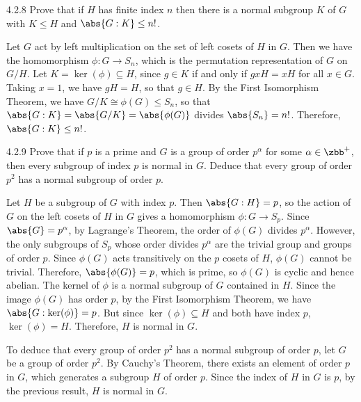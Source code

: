\begin{exercise}{4.2.8}
	Prove that if $H$ has finite index $n$ then there is a normal subgroup $K$ of $G$ with $K \leq H$ and $\abs{G : K} \leq n!$.
\end{exercise}

\begin{sol}
	Let $G$ act by left multiplication on the set of left cosets of $H$ in $G$.
	Then we have the homomorphism $\phi \colon G \to S_n$, which is the permutation representation of $G$ on $G/H$.
	Let $K = \ker(\phi) \subseteq H$, since $g \in K$ if and only if $gxH = xH$ for all $x \in G$.
	Taking $x = 1$, we have $gH = H$, so that $g \in H$.
	By the First Isomorphism Theorem, we have $G/K \cong \phi(G) \leq S_n$, so that $\abs{G : K} = \abs{G/K} = \abs{\phi(G)}$ divides $\abs{S_n} = n!$.
	Therefore, $\abs{G : K} \leq n!$.
\end{sol}

\begin{exercise}{4.2.9}
	Prove that if $p$ is a prime and $G$ is a group of order $p^\alpha$ for some $\alpha \in \zbb^+$, then every subgroup of index $p$ is normal in $G$.
	Deduce that every group of order $p^2$ has a normal subgroup of order $p$.
\end{exercise}

\begin{sol}
	Let $H$ be a subgroup of $G$ with index $p$.
	Then $\abs{G : H} = p$, so the action of $G$ on the left cosets of $H$ in $G$ gives a homomorphism $\phi \colon G \to S_p$.
	Since $\abs{G} = p^\alpha$, by Lagrange's Theorem, the order of $\phi(G)$ divides $p^\alpha$.
	However, the only subgroups of $S_p$ whose order divides $p^\alpha$ are the trivial group and groups of order $p$.
	Since $\phi(G)$ acts transitively on the $p$ cosets of $H$, $\phi(G)$ cannot be trivial.
	Therefore, $\abs{\phi(G)} = p$, which is prime, so $\phi(G)$ is cyclic and hence abelian.
	The kernel of $\phi$ is a normal subgroup of $G$ contained in $H$.
	Since the image $\phi(G)$ has order $p$, by the First Isomorphism Theorem, we have $\abs{G : \ker(\phi)} = p$.
	But since $\ker(\phi) \subseteq H$ and both have index $p$, $\ker(\phi) = H$.
	Therefore, $H$ is normal in $G$.

	To deduce that every group of order $p^2$ has a normal subgroup of order $p$, let $G$ be a group of order $p^2$.
	By Cauchy's Theorem, there exists an element of order $p$ in $G$, which generates a subgroup $H$ of order $p$.
	Since the index of $H$ in $G$ is $p$, by the previous result, $H$ is normal in $G$.
\end{sol}

